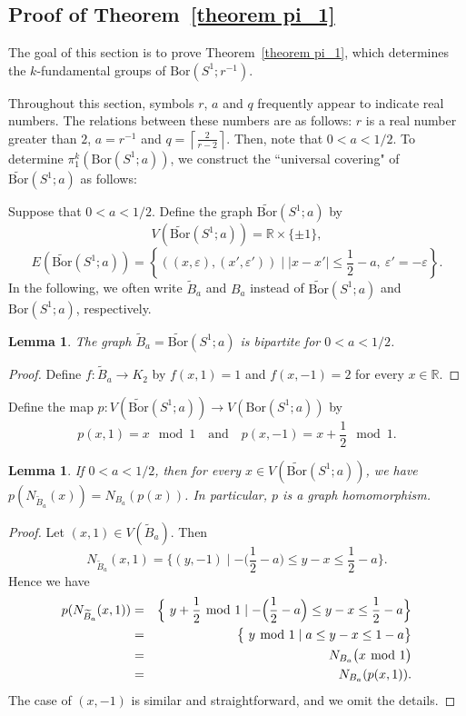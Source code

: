 \documentclass[11pt, amsfonts]{amsart}
\numberwithin{equation}{section}
\newtheorem{lemma}[thm]{Lemma}
\theoremstyle{definition}
\theoremstyle{remark}
\newcommand{\RR}{\mathbb{R}}
\newcommand{\tB}{\widetilde{B}}
\newcommand{\Bor}{\mathrm{Bor}}
\newcommand{\tBor}{\widetilde{\mathrm{Bor}}}
\begin{document}
\subsection{Proof of Theorem~\ref{theorem pi_1}}

The goal of this section is to prove Theorem~\ref{theorem pi_1}, which determines the $k$-fundamental groups of $\Bor(S^1; r^{-1})$.

Throughout this section, symbols $r$, $a$ and $q$ frequently appear to indicate real numbers. The relations between these numbers are as follows: $r$ is a real number greater than $2$, $a = r^{-1}$ and $q = \left\lceil \frac{2}{r-2} \right\rceil$. Then, note that $0 < a < 1/2$.
To determine $\pi_1^k(\Bor(S^1; a))$, we construct the ``universal covering" of $\tBor(S^1; a)$ as follows:

Suppose that $0 < a < 1/2$. Define the graph $\tBor(S^1; a)$ by
\[ V(\tBor(S^1; a)) = \RR \times \{ \pm 1\},\]
\[ E(\tBor(S^1; a)) = \left\{ \left((x,\varepsilon), (x', \varepsilon') \right) \mid |x - x'| \le \frac{1}{2} - a,\ \varepsilon' = - \varepsilon \right\}.\]
In the following, we often write $\tB_a$ and $B_a$ instead of $\tBor(S^1 ; a)$ and $\Bor(S^1; a)$, respectively.

\begin{lemma} \label{lemma bipartite}
The graph $\tB_a = \tBor(S^1; a)$ is bipartite for $0 < a < 1/2$.
\end{lemma}
\begin{proof}
Define $f \colon \tB_a \to K_2$ by $f(x,1) = 1$ and $f(x, - 1) = 2$ for every $x \in \RR$.
\end{proof}

Define the map $p \colon V(\tBor(S^1 ; a)) \to V(\Bor(S^1 ; a))$ by
\[ p(x, 1) = x \mod 1 \quad \textrm{and} \quad p(x, -1) = x + \frac{1}{2} \mod 1.\]

\begin{lemma} \label{lemma surjective}
If $0 < a < 1/2$, then for every $x \in V(\tBor(S^1; a))$, we have $p(N_{\tB_a}(x)) = N_{B_a}(p(x))$. In particular, $p$ is a graph homomorphism.
\end{lemma}
\begin{proof}
Let $(x,1) \in V(\tB_a)$. Then
\[ N_{\tB_a}(x,1) = \Big\{ (y, -1) \mid - \Big( \frac{1}{2} - a \Big) \le y - x  \le  \frac{1}{2} - a \Big\}.\]
Hence we have
\begin{eqnarray*}
p(N_{\tB_a}(x,1)) &=& \Big\{ \ y + \frac{1}{2} \hspace{-1mm}\mod 1 \mid - \Big( \frac{1}{2} - a \Big) \le y - x  \le \frac{1}{2} - a \Big\} \\
&=& \big\{ \ y \hspace{-1mm}\mod 1 \mid a \le y - x \le 1 - a \big\} \\
&=& N_{B_a}\big( x \hspace{-1mm}\mod 1 \big)\\
&=& N_{B_a}(p(x,1)).
\end{eqnarray*}
The case of $(x,-1)$ is similar and straightforward, and we omit the details.
\end{proof}
\end{document}
